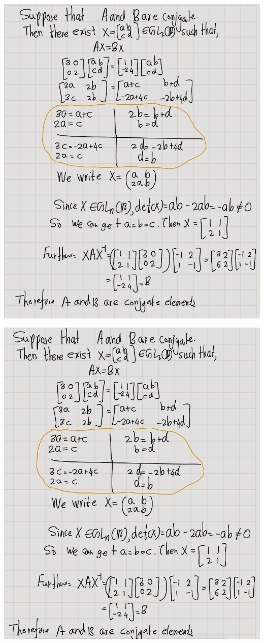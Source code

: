 \documentclass[
]{book}
\theoremstyle{definition}
\theoremstyle{definition}
\theoremstyle{definition}
\theoremstyle{definition}
\theoremstyle{remark}
\begin{document}
\includegraphics{figures/ch_2/fig83.png}

\includegraphics{figures/ch_2/fig84.png}
\end{document}
